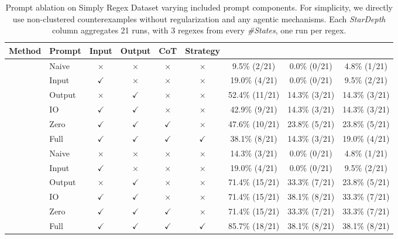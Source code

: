 \begin{table}[t]
\centering
\small
\setlength{\tabcolsep}{4pt}
\begin{tabular}{llccccccc}
\toprule
Method & Prompt & Input & Output & CoT & Strategy &  &  &  \\
\midrule
{} & Naive & $\times$ & $\times$ & $\times$ & $\times$ & 9.5\% (2/21) & 0.0\% (0/21) & 4.8\% (1/21) \\
 & Input & $\checkmark$ & $\times$ & $\times$ & $\times$ & 19.0\% (4/21) & 0.0\% (0/21) & 9.5\% (2/21) \\
 & Output & $\times$ & $\checkmark$ & $\times$ & $\times$ & 52.4\% (11/21) & 14.3\% (3/21) & 14.3\% (3/21) \\
 & IO & $\checkmark$ & $\checkmark$ & $\times$ & $\times$ & 42.9\% (9/21) & 14.3\% (3/21) & 14.3\% (3/21) \\
 & Zero & $\checkmark$ & $\checkmark$ & $\checkmark$ & $\times$ & 47.6\% (10/21) & 23.8\% (5/21) & 23.8\% (5/21) \\
 & Full & $\checkmark$ & $\checkmark$ & $\checkmark$ & $\checkmark$ & 38.1\% (8/21) & 14.3\% (3/21) & 19.0\% (4/21) \\
\midrule
{} & Naive & $\times$ & $\times$ & $\times$ & $\times$ & 14.3\% (3/21) & 0.0\% (0/21) & 4.8\% (1/21) \\
 & Input & $\checkmark$ & $\times$ & $\times$ & $\times$ & 19.0\% (4/21) & 0.0\% (0/21) & 9.5\% (2/21) \\
 & Output & $\times$ & $\checkmark$ & $\times$ & $\times$ & 71.4\% (15/21) & 33.3\% (7/21) & 23.8\% (5/21) \\
 & IO & $\checkmark$ & $\checkmark$ & $\times$ & $\times$ & 71.4\% (15/21) & 38.1\% (8/21) & 33.3\% (7/21) \\
 & Zero & $\checkmark$ & $\checkmark$ & $\checkmark$ & $\times$ & 71.4\% (15/21) & 33.3\% (7/21) & 33.3\% (7/21) \\
 & Full & $\checkmark$ & $\checkmark$ & $\checkmark$ & $\checkmark$ & 85.7\% (18/21) & 38.1\% (8/21) & 38.1\% (8/21) \\
\bottomrule
\end{tabular}
\caption{Prompt ablation on Simply Regex Dataset varying included prompt components. For simplicity, we directly use non-clustered counterexamples without regularization and any agentic mechanisms. Each \emph{StarDepth} column aggregates 21 runs, with 3 regexes from every \emph{\#States}, one run per regex.}
\label{tab:simplyrx-prompt-ablation}
\end{table}
